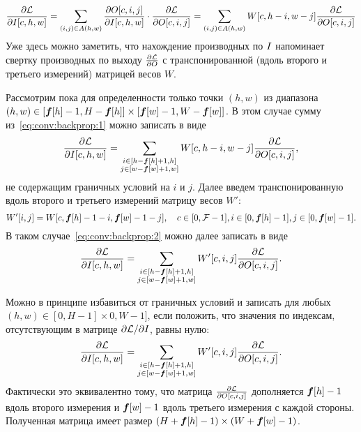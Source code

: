 \documentclass{report}
\numberwithin{theorem}{chapter}
\numberwithin{statement}{chapter}
\numberwithin{lemma}{chapter}
\theoremstyle{definition}
\numberwithin{task}{chapter}
\theoremstyle{remark}
\numberwithin{example}{chapter}
\theoremstyle{definition}
\numberwithin{definition}{chapter}
\theoremstyle{remark}
\theoremstyle{remark}
\numberwithin{lyrics}{section}
\begin{document}
\begin{equation}
\label{eq:conv:backprop:1}
\frac{\partial \mathcal{L} }{\partial I[c, h, w]}= \sum\limits_{(i, j) \in A(h, w)} 
\frac{\partial O[c, i, j] }{\partial I[c, h, w]} \cdot \frac{\partial \mathcal{L} }{\partial O[c, i, j]} = 
\sum\limits_{(i, j) \in A(h, w)} W[c, h - i, w - j] \frac{\partial \mathcal{L} }{\partial O[c, i, j]}
\end{equation}
Уже здесь можно заметить, что нахождение производных по $I$ напоминает свертку производных по выходу $\frac{\partial \mathcal{L} }{\partial O}$
с транспонированной (вдоль второго и третьего измерений) матрицей весов $W$.

Рассмотрим пока для определенности только точки $(h, w)$ из диапазона $(h, w) \in [\boldsymbol{f}[h] - 1, H - \boldsymbol{f}[h]] \times [\boldsymbol{f}[w] - 1, W - \boldsymbol{f}[w]]$. В этом случае сумму из~\eqref{eq:conv:backprop:1} можно записать в виде
\begin{equation}
\label{eq:conv:backprop:2}
\frac{\partial \mathcal{L} }{\partial I[c, h, w]} = \sum\limits_{\substack{i \in [h - \boldsymbol{f}[h] + 1, h] \\ j \in [w - \boldsymbol{f}[w] + 1, w]}} W[c, h - i, w - j] \frac{\partial \mathcal{L} }{\partial O[c, i, j]},
\end{equation}
не содержащим граничных условий на $i$ и $j$. Далее введем транспонированную вдоль второго и третьего измерений матрицу весов $W'$:
\begin{equation}
W'[i, j] = W[c, \boldsymbol{f}[h] - 1 - i, \boldsymbol{f}[w] - 1 - j], \quad c \in [0, \mathcal{F} - 1], i \in [0, \boldsymbol{f}[h] - 1], j \in [0, \boldsymbol{f}[w] - 1].
\end{equation}
В таком случае~\eqref{eq:conv:backprop:2} можно далее записать в виде
\begin{equation}
\frac{\partial \mathcal{L} }{\partial I[c, h, w]} = \sum\limits_{\substack{i \in [h - \boldsymbol{f}[h] + 1, h] \\ j \in [w - \boldsymbol{f}[w] + 1, w]}} W'[c, i, j] \frac{\partial \mathcal{L} }{\partial O[c, i, j]}.
\end{equation}

Можно в принципе избавиться от граничных условий и записать для любых $(h, w) \in [0, H - 1] \times 0, W - 1]$, если положить, что значения по индексам, отсутствующим в матрице $\partial \mathcal{L} / \partial I$, равны нулю:
\begin{equation}
\frac{\partial \mathcal{L} }{\partial I[c, h, w]} = \sum\limits_{\substack{i \in [h - \boldsymbol{f}[h] + 1, h] \\ j \in [w - \boldsymbol{f}[w] + 1, w]}} W'[c, i, j] \frac{\partial \mathcal{L} }{\partial O[c, i, j]}.
\end{equation}
Фактически это эквивалентно тому, что матрица $\frac{\partial \mathcal{L} }{\partial O[c, i, j]}$ дополняется $\boldsymbol{f}[h] - 1$ вдоль второго измерения и $\boldsymbol{f}[w] - 1$ вдоль третьего измерения с каждой стороны. Полученная матрица имеет размер $(H + \boldsymbol{f}[h] - 1) \times (W + \boldsymbol{f}[w] - 1)$. 
\end{document}

